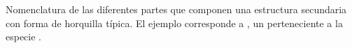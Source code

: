 \label{fig:hairpin-parts} Nomenclatura de las diferentes partes que
componen una estructura secundaria con forma de horquilla típica.
El ejemplo corresponde a , un \premirna{}
perteneciente a la especie \footnotemark.
